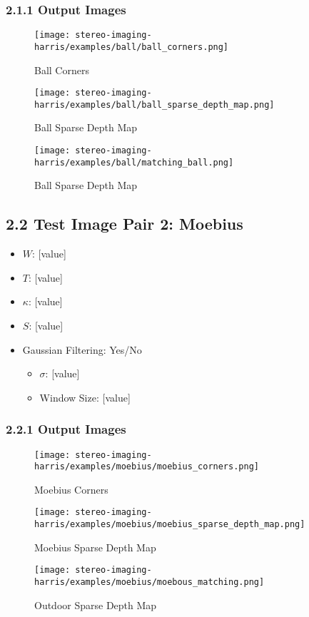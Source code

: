 \documentclass[12pt]{article}
\begin{document}
\subsubsection*{2.1.1 Output Images}
\begin{figure}[H]
    \centering
    \texttt{[image: stereo-imaging-harris/examples/ball/ball\_corners.png]}
    \caption{Ball Corners}
\end{figure}
\begin{figure}[H]
    \centering
    \texttt{[image: stereo-imaging-harris/examples/ball/ball\_sparse\_depth\_map.png]}
    \caption{Ball Sparse Depth Map}
\end{figure}
\begin{figure}[H]
    \centering
    \texttt{[image: stereo-imaging-harris/examples/ball/matching\_ball.png]}
    \caption{Ball Sparse Depth Map}
\end{figure}

\subsection*{2.2 Test Image Pair 2: Moebius}
\begin{itemize}
    \item $W$: [value]
    \item $T$: [value]
    \item $\kappa$: [value]
    \item $S$: [value]
    \item Gaussian Filtering: Yes/No
    \begin{itemize}
        \item $\sigma$: [value]
        \item Window Size: [value]
    \end{itemize}
\end{itemize}

\subsubsection*{2.2.1 Output Images}
\begin{figure}[H]
    \centering
    \texttt{[image: stereo-imaging-harris/examples/moebius/moebius\_corners.png]}
    \caption{Moebius Corners}
\end{figure}
\begin{figure}[H]
    \centering
    \texttt{[image: stereo-imaging-harris/examples/moebius/moebius\_sparse\_depth\_map.png]}
    \caption{Moebius Sparse Depth Map}
\end{figure}
\begin{figure}[H]
    \centering
    \texttt{[image: stereo-imaging-harris/examples/moebius/moebous\_matching.png]}
    \caption{Outdoor Sparse Depth Map}
\end{figure}
\end{document}
